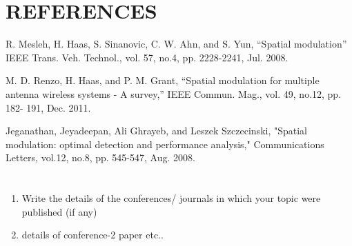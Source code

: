 \documentclass[12pt,a4paper]{report}
\begin{document}
\chapter*{REFERENCES}

\begin{enumerate}[{[1]}]
\item R. Mesleh, H. Haas, S. Sinanovic, C. W. Ahn, and S. Yun, “Spatial modulation” IEEE Trans. Veh. Technol., vol. 57, no.4, pp. 2228-2241, Jul. 2008.
\item M. D. Renzo, H. Haas, and P. M. Grant, “Spatial modulation for multiple antenna wireless systems - A survey,” IEEE Commun. Mag., vol. 49, no.12, pp. 182- 191, Dec. 2011.
\item Jeganathan, Jeyadeepan, Ali Ghrayeb, and Leszek Szczecinski, "Spatial modulation: optimal detection and performance analysis," Communications Letters, vol.12, no.8, pp. 545-547, Aug. 2008.

\end{enumerate}


\chapter*{}



\begin{enumerate}
\item{Write the details of the conferences/ journals in which your topic were published (if any)}
\item{ details of conference-2 paper etc..}

\end{enumerate}
\end{document}
